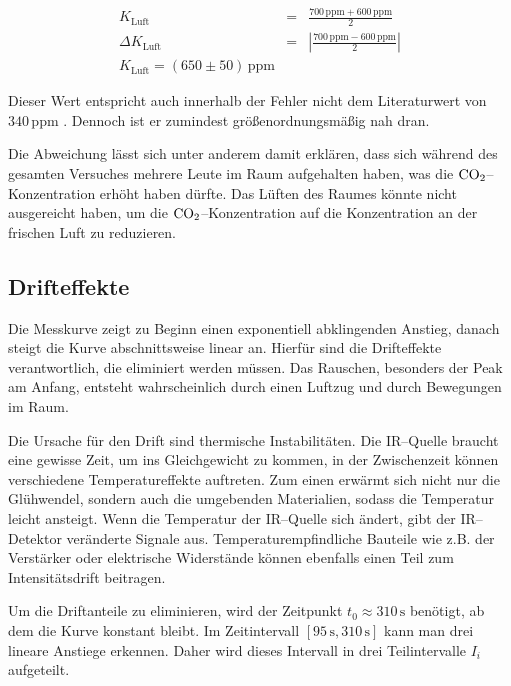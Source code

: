 \documentclass[12pt,a4paper]{scrartcl}
\numberwithin{equation}{section} %
\begin{document}
\begin{eqnarray}
	K_\mathrm{Luft} &=& \frac{700 \mathrm{\, ppm} + 600 \mathrm{\, ppm}}{2} \\
	\Delta K_\mathrm{Luft} &=& \left|\frac{700 \mathrm{\, ppm} - 600 \mathrm{\, ppm}}{2}\right| \\
	K_\mathrm{Luft} = (650 \pm 50) \mathrm{\, ppm}
\end{eqnarray}

Dieser Wert entspricht auch innerhalb der Fehler nicht dem Literaturwert von $340 \mathrm{\, ppm}$ \cite{Demtröder Kern/Atom}. Dennoch ist er zumindest größenordnungsmäßig nah dran.

Die Abweichung lässt sich unter anderem damit erklären, dass sich während des gesamten Versuches mehrere Leute im Raum aufgehalten haben, was die $\ce{CO_2}$--Konzentration erhöht haben dürfte. Das Lüften des Raumes könnte nicht ausgereicht haben, um die $\ce{CO_2}$--Konzentration auf die Konzentration an der frischen Luft zu reduzieren.

\subsection{Drifteffekte}
\label{Drifteffekte}

Die Messkurve zeigt zu Beginn einen exponentiell abklingenden Anstieg, danach steigt die Kurve abschnittsweise linear an. Hierfür sind die Drifteffekte verantwortlich, die eliminiert werden müssen. Das Rauschen, besonders der Peak am Anfang, entsteht wahrscheinlich durch einen Luftzug und durch Bewegungen im Raum.

Die Ursache für den Drift sind thermische Instabilitäten. Die IR--Quelle braucht eine gewisse Zeit, um ins Gleichgewicht zu kommen, in der Zwischenzeit können verschiedene Temperatureffekte auftreten. Zum einen erwärmt sich nicht nur die Glühwendel, sondern auch die umgebenden Materialien, sodass die Temperatur leicht ansteigt. Wenn die Temperatur der IR--Quelle sich ändert, gibt der IR--Detektor veränderte Signale aus. Temperaturempfindliche Bauteile wie z.B. der Verstärker oder elektrische Widerstände können ebenfalls einen Teil zum Intensitätsdrift beitragen.

Um die Driftanteile zu eliminieren, wird der Zeitpunkt $t_0\approx310\mathrm{\,s}$ benötigt, ab dem die Kurve konstant bleibt. Im Zeitintervall $[95\mathrm{\,s}, 310\mathrm{\,s}]$ kann man drei lineare Anstiege erkennen. Daher wird dieses Intervall in drei Teilintervalle $I_i$ aufgeteilt.
\end{document}
